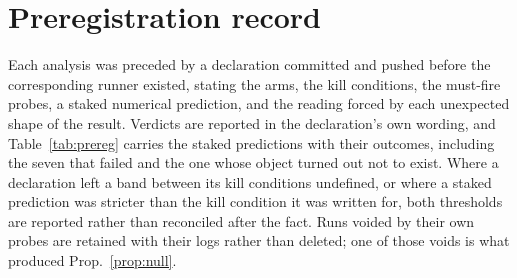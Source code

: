 \documentclass[11pt]{article}
\begin{document}
\FloatBarrier


\section{Preregistration record}
\label{app:prereg}

Each analysis was preceded by a declaration committed and pushed before the corresponding runner
existed, stating the arms, the kill conditions, the must-fire probes, a staked numerical
prediction, and the reading forced by each unexpected shape of the result. Verdicts are reported
in the declaration's own wording, and Table~\ref{tab:prereg} carries the staked predictions with
their outcomes, including the seven that failed and the one whose object turned out not to exist.
Where a declaration left a band between its kill conditions undefined, or where a staked prediction
was stricter than the kill condition it was written for, both thresholds are reported rather than
reconciled after the fact. Runs voided by their own probes are retained with
their logs rather than deleted; one of those voids is what produced Prop.~\ref{prop:null}.
\end{document}
